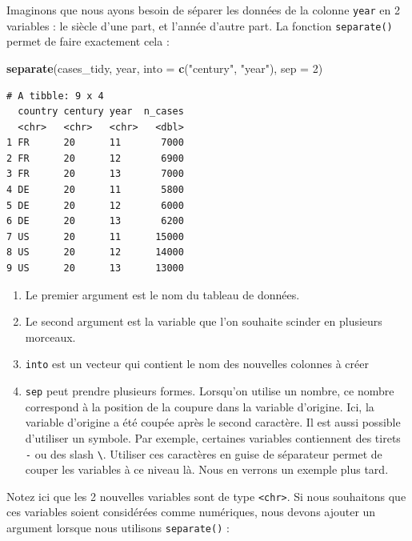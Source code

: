 \documentclass[
  a4paper,
]{article}
\newenvironment{Shaded}{\begin{snugshade}}{\end{snugshade}}
\newcommand{\DataTypeTok}[1]{\textcolor[rgb]{0.00,0.34,0.68}{#1}}
\newcommand{\DecValTok}[1]{\textcolor[rgb]{0.69,0.50,0.00}{#1}}
\newcommand{\KeywordTok}[1]{\textcolor[rgb]{0.12,0.11,0.11}{\textbf{#1}}}
\newcommand{\NormalTok}[1]{\textcolor[rgb]{0.12,0.11,0.11}{#1}}
\newcommand{\StringTok}[1]{\textcolor[rgb]{0.75,0.01,0.01}{#1}}
\providecommand{\tightlist}{%
  \setlength{\itemsep}{0pt}\setlength{\parskip}{0pt}}
\begin{document}
Imaginons que nous ayons besoin de séparer les données de la colonne \texttt{year} en 2 variables : le siècle d'une part, et l'année d'autre part. La fonction \texttt{separate()} permet de faire exactement cela :

\begin{Shaded}
\begin{Highlighting}[]
\KeywordTok{separate}\NormalTok{(cases_tidy, year, }\DataTypeTok{into =} \KeywordTok{c}\NormalTok{(}\StringTok{"century"}\NormalTok{, }\StringTok{"year"}\NormalTok{), }\DataTypeTok{sep =} \DecValTok{2}\NormalTok{)}
\end{Highlighting}
\end{Shaded}

\begin{verbatim}
# A tibble: 9 x 4
  country century year  n_cases
  <chr>   <chr>   <chr>   <dbl>
1 FR      20      11       7000
2 FR      20      12       6900
3 FR      20      13       7000
4 DE      20      11       5800
5 DE      20      12       6000
6 DE      20      13       6200
7 US      20      11      15000
8 US      20      12      14000
9 US      20      13      13000
\end{verbatim}

\begin{enumerate}
\def\labelenumi{\arabic{enumi}.}
\tightlist
\item
  Le premier argument est le nom du tableau de données.
\item
  Le second argument est la variable que l'on souhaite scinder en plusieurs morceaux.
\item
  \texttt{into} est un vecteur qui contient le nom des nouvelles colonnes à créer
\item
  \texttt{sep} peut prendre plusieurs formes. Lorsqu'on utilise un nombre, ce nombre correspond à la position de la coupure dans la variable d'origine. Ici, la variable d'origine a été coupée après le second caractère. Il est aussi possible d'utiliser un symbole. Par exemple, certaines variables contiennent des tirets \texttt{-} ou des slash \texttt{\textbackslash{}}. Utiliser ces caractères en guise de séparateur permet de couper les variables à ce niveau là. Nous en verrons un exemple plus tard.
\end{enumerate}

Notez ici que les 2 nouvelles variables sont de type \texttt{\textless{}chr\textgreater{}}. Si nous souhaitons que ces variables soient considérées comme numériques, nous devons ajouter un argument lorsque nous utilisons \texttt{separate()} :
\end{document}
